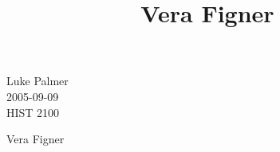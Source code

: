 \documentclass[12pt]{article}
\title{Vera Figner}
\begin{document}
\noindent Luke Palmer \\
2005-09-09 \\
HIST 2100

\begin{center}
\Huge{Vera Figner}
\end{center}

\doublespace
\end{document}
